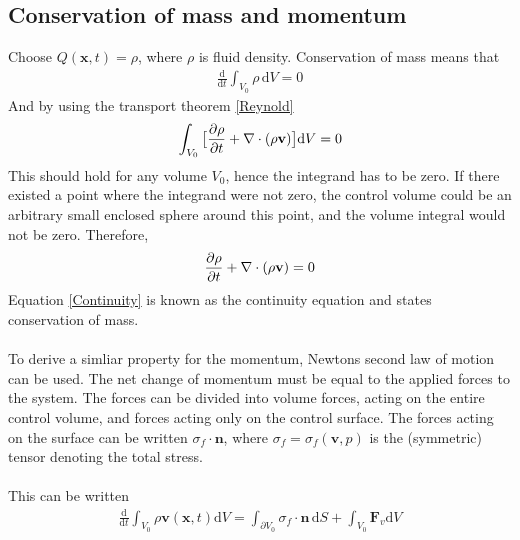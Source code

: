 \subsection{Conservation of mass and momentum}
Choose $Q(\mathbf{x},t) = \rho$, where $\rho$ is fluid density. Conservation of mass means that
\begin{align*} 
\frac{\mathrm{d}}{\mathrm{d}t} \int_{V_0} \rho \, \mathrm{d}V = 0
\end{align*}
And by using the transport theorem \eqref{Reynold}
\begin{align}
\int_{V_0} \big{[}\frac{\partial \rho}{\partial t} + \nabla \cdot (\rho \mathbf{v}) \big{]}\mathrm{d}V = 0
\end{align}
This should hold for any volume $V_0$, hence the integrand has to be zero. If there existed a point where the integrand were not zero, the control volume could be an arbitrary small enclosed sphere around this point, and the volume integral would not be zero. Therefore, 
\begin{align} 
\frac{\partial \rho}{\partial t} + \nabla \cdot (\rho \mathbf{v}) = 0 \label{Continuity}
\end{align}
Equation \eqref{Continuity} is known as the continuity equation and states conservation of mass. 
\\
\\
To derive a simliar property for the momentum, Newtons second law of motion can be used. The net change of momentum must be equal to the applied forces to the system. The forces can be divided into volume forces, acting on the entire control volume, and forces acting only on the control surface. The forces acting on the surface can be written $\sigma_f \cdot \mathbf{n}$, where $\sigma_f = \sigma_f(\mathbf{v}, p)$ is the (symmetric) tensor denoting the total stress. \\
\\
This can be written
\begin{align*} \frac{\mathrm{d}}{\mathrm{d}t} \int_{V_0} \rho \mathbf{v}(\mathbf{x},t) \mathrm{d}V = \int_{\partial V_0}\sigma_f \cdot \mathbf{n} \,\mathrm{d}S + \int_{V_0} \mathbf{F}_v \mathrm{d}V
\end{align*}

